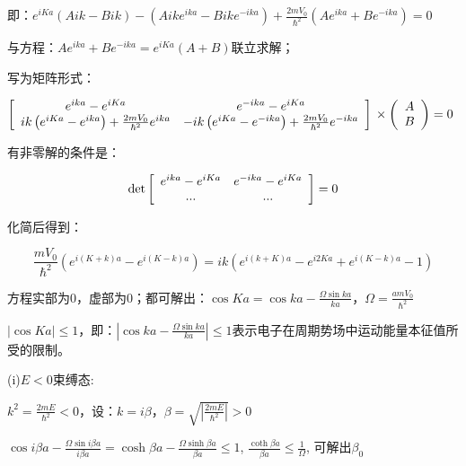 即：$e^{iKa} \left( {Aik - Bik} \right) - \left( {Aike^{ika}  - Bike^{ - ika} } \right) + \frac{{2mV_0 }}{{\hbar ^2 }}\left( {Ae^{ika}  + Be^{ - ika} } \right) = 0$

与方程：$Ae^{ika}  + Be^{ - ika}  = e^{iKa} \left( {A + B} \right)$联立求解；

写为矩阵形式：

$\left[ {\begin{array}{*{20}c}
   {e^{ika}  - e^{iKa} } & {e^{ - ika}  - e^{iKa} }  \\
   {ik\left( {e^{iKa}  - e^{ika} } \right) + \frac{{2mV_0 }}{{\hbar ^2 }}e^{ika} } & { - ik\left( {e^{iKa}  - e^{ - ika} } \right) + \frac{{2mV_0 }}{{\hbar ^2 }}e^{ - ika} }  \\
\end{array}} \right] \\ \times \left( {\begin{array}{*{20}c}
   A  \\
   B  \\
\end{array}} \right) = 0$

有非零解的条件是：

\begin{equation*}
\det \left[ {\begin{array}{*{20}c}  {e^{ika} - e^{iKa}} & { e^{-ika} - e^{iKa} } \\ { ... } & {...} \\ \end{array} } \right] = 0
\end{equation*}

化简后得到：

\begin{equation*}
\frac{{mV_0 }}{{\hbar ^2 }}\left( {e^{i(K + k)a}  - e^{i(K - k)a} } \right) = ik\left( {e^{i(k + K)a}  - e^{i2Ka}  + e^{i(K - k)a}  - 1} \right) 
\end{equation*}

方程实部为0，虚部为0；都可解出：$\cos Ka = \cos ka - \frac{{\Omega \sin ka}}{{ka}}$，$\Omega  = \frac{{amV_0 }}{{\hbar ^2 }}$

$\left| {\cos Ka} \right| \le 1$，即：$\left| {\cos ka - \frac{{\Omega \sin ka}}{{ka}}} \right| \le 1$表示电子在周期势场中运动能量本征值所受的限制。

(i)$E < 0$束缚态:

$k^2  = \frac{{2mE}}{{\hbar ^2 }} < 0$，设：$k = i\beta $，$\beta  = \sqrt {\left| {\frac{{2mE}}{{\hbar ^2 }}} \right|}  > 0$

$\cos i\beta a - \frac{{\Omega \sin i\beta a}}{{i\beta a}} = \cosh \beta a - \frac{{\Omega \sinh \beta a}}{{\beta a}} \le 1$, $\frac{{\coth \beta a}}{{\beta a}} \le \frac{1}{\Omega }$, 可解出$\beta _0$

